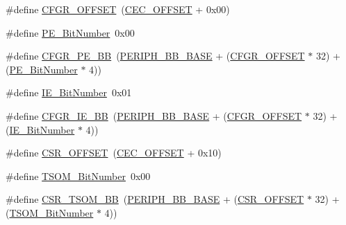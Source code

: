 \begin{DoxyCompactItemize}
\item 
\#define \hyperlink{group___c_e_c___private___defines_ga8682298330c3b9bae1992e4f1a0af985}{C\+F\+G\+R\+\_\+\+O\+F\+F\+S\+ET}~(\hyperlink{group___c_e_c___private___defines_ga675324bd8967b75f32554f50210821af}{C\+E\+C\+\_\+\+O\+F\+F\+S\+ET} + 0x00)
\item 
\#define \hyperlink{group___c_e_c___private___defines_ga321e547b9574b065127c882e09a4f7e7}{P\+E\+\_\+\+Bit\+Number}~0x00
\item 
\#define \hyperlink{group___c_e_c___private___defines_ga9d1f044508cda5ad8213bd7bc5c4363d}{C\+F\+G\+R\+\_\+\+P\+E\+\_\+\+BB}~(\hyperlink{openmotestm_2library_2inc_2stm32f10x__map_8h_aed7efc100877000845c236ccdc9e144a}{P\+E\+R\+I\+P\+H\+\_\+\+B\+B\+\_\+\+B\+A\+SE} + (\hyperlink{openmotestm_2library_2src_2stm32f10x__rcc_8c_a8682298330c3b9bae1992e4f1a0af985}{C\+F\+G\+R\+\_\+\+O\+F\+F\+S\+ET} $\ast$ 32) + (\hyperlink{group___c_e_c___private___defines_ga321e547b9574b065127c882e09a4f7e7}{P\+E\+\_\+\+Bit\+Number} $\ast$ 4))
\item 
\#define \hyperlink{group___c_e_c___private___defines_ga57731312db52f3498312a56e98166fad}{I\+E\+\_\+\+Bit\+Number}~0x01
\item 
\#define \hyperlink{group___c_e_c___private___defines_gac7fe35cf912353ca51a56c5f1f25b2fb}{C\+F\+G\+R\+\_\+\+I\+E\+\_\+\+BB}~(\hyperlink{openmotestm_2library_2inc_2stm32f10x__map_8h_aed7efc100877000845c236ccdc9e144a}{P\+E\+R\+I\+P\+H\+\_\+\+B\+B\+\_\+\+B\+A\+SE} + (\hyperlink{openmotestm_2library_2src_2stm32f10x__rcc_8c_a8682298330c3b9bae1992e4f1a0af985}{C\+F\+G\+R\+\_\+\+O\+F\+F\+S\+ET} $\ast$ 32) + (\hyperlink{group___c_e_c___private___defines_ga57731312db52f3498312a56e98166fad}{I\+E\+\_\+\+Bit\+Number} $\ast$ 4))
\item 
\#define \hyperlink{group___c_e_c___private___defines_ga984cbe73312b6d3d355c5053763d499a}{C\+S\+R\+\_\+\+O\+F\+F\+S\+ET}~(\hyperlink{group___c_e_c___private___defines_ga675324bd8967b75f32554f50210821af}{C\+E\+C\+\_\+\+O\+F\+F\+S\+ET} + 0x10)
\item 
\#define \hyperlink{group___c_e_c___private___defines_ga1a470abab836eba7b451950938708946}{T\+S\+O\+M\+\_\+\+Bit\+Number}~0x00
\item 
\#define \hyperlink{group___c_e_c___private___defines_ga4971cc50b0ead4a493e2a9c03966c826}{C\+S\+R\+\_\+\+T\+S\+O\+M\+\_\+\+BB}~(\hyperlink{openmotestm_2library_2inc_2stm32f10x__map_8h_aed7efc100877000845c236ccdc9e144a}{P\+E\+R\+I\+P\+H\+\_\+\+B\+B\+\_\+\+B\+A\+SE} + (\hyperlink{openmotestm_2library_2src_2stm32f10x__rcc_8c_a984cbe73312b6d3d355c5053763d499a}{C\+S\+R\+\_\+\+O\+F\+F\+S\+ET} $\ast$ 32) + (\hyperlink{group___c_e_c___private___defines_ga1a470abab836eba7b451950938708946}{T\+S\+O\+M\+\_\+\+Bit\+Number} $\ast$ 4))

\end{DoxyCompactItemize}
